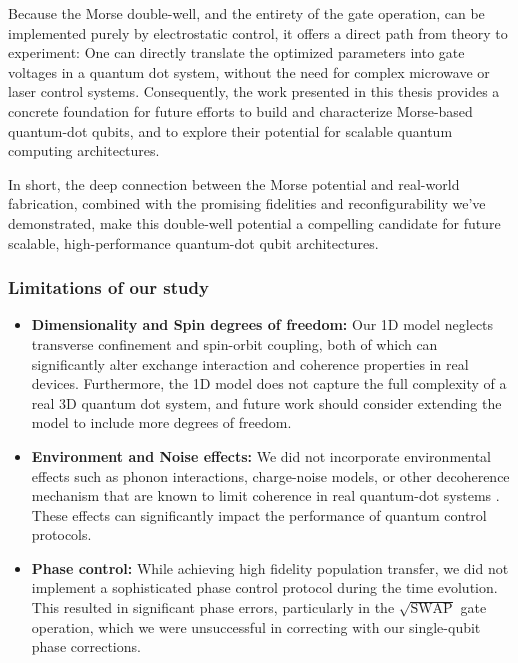 \documentclass{subfiles}
\begin{document}
Because the Morse double-well, and the entirety of the gate operation, can be implemented purely by electrostatic control, it offers a direct path from theory to experiment: One can directly translate the optimized parameters into gate voltages in a quantum dot system, without the need for complex microwave or laser control systems. Consequently, the work presented in this thesis provides a concrete foundation for future efforts to build and characterize Morse-based quantum-dot qubits, and to explore their potential for scalable quantum computing architectures. 

In short, the deep connection between the Morse potential and real-world fabrication, combined with the promising fidelities and reconfigurability we've demonstrated, make this double-well potential a compelling candidate for future scalable, high-performance quantum-dot qubit architectures. 

\subsubsection*{Limitations of our study}
\begin{itemize}
    \item \textbf{Dimensionality and Spin degrees of freedom:} Our 1D model neglects transverse confinement and spin-orbit coupling, both of which can significantly alter exchange interaction and coherence properties in real devices. Furthermore, the 1D model does not capture the full complexity of a real 3D quantum dot system, and future work should consider extending the model to include more degrees of freedom.
    \item \textbf{Environment and Noise effects:} We did not incorporate environmental effects such as phonon interactions, charge-noise models, or other decoherence mechanism that are known to limit coherence in real quantum-dot systems \cite{jacak2013quantum, nielsen2010quantum}. These effects can significantly impact the performance of quantum control protocols.
    \item \textbf{Phase control:} While achieving high fidelity population transfer, we did not implement a sophisticated phase control protocol during the time evolution. This resulted in significant phase errors, particularly in the $\sqrt{\text{SWAP}}$ gate operation, which we were unsuccessful in correcting with our single-qubit phase corrections. 
\end{itemize}
\end{document}
